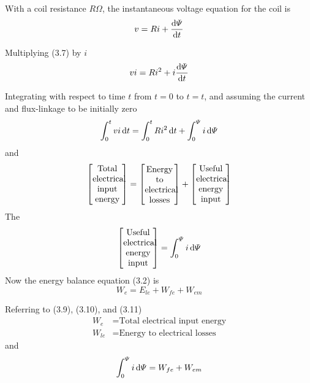 \documentclass[a4paper,numbers=noenddot,12pt]{scrbook}
\begin{document}
With a coil resistance $R \Omega$, the instantaneous voltage equation for the coil is
\begin{equation}
    v = Ri + \dfrac{\dif \varPsi}{\dif t}
    \label{eq:Eq3.7}
\end{equation}

Multiplying (3.7) by $i$
\begin{equation}
    vi = Ri^2 + i \dfrac{\dif \varPsi}{\dif t}
    \label{eq:Eq3.8}
\end{equation}

Integrating with respect to time $t$ from $t = 0$ to $t = t$, and assuming the current and flux-linkage to be initially zero
\begin{equation}
    \int_0^t vi \dif t = \int_0^t Ri^2 \dif t + \int_0^{\varPsi} i \dif \varPsi
    \label{eq:Eq3.9}
\end{equation}
and
\begin{equation}
    \left[
        \parbox{8ex}{\centering Total \\ electrical \\ input \\ energy}
    \right]
    =
    \left[
        \parbox{8ex}{\centering Energy \\ to \\ electrical \\ losses}
    \right]
    +
    \left[
        \parbox{8ex}{\centering Useful \\ electrical \\ energy \\ input}
    \right]
    \label{eq:Eq3.10}
\end{equation}
The
\begin{equation}
    \left[
        \parbox{8ex}{\centering Useful \\ electrical \\ energy \\ input}
    \right]
    =
    \int_0^{\varPsi} i \dif \varPsi
    \label{eq:Eq3.11}
\end{equation}
Now the energy balance equation (3.2) is
\begin{equation*}
    W_e = E_{le} + W_{fe} + W_{em}
\end{equation*}

Referring to (3.9), (3.10), and (3.11)
\begin{align*}
    W_e & = \text{Total electrical input energy}\\
    W_{le} & = \text{Energy to electrical losses}
\end{align*}
and
\begin{equation}
    \int_0^{\varPsi} i \dif \varPsi = W_{fe} + W_{em}
    \label{eq:Eq3.12}
\end{equation}
\end{document}

